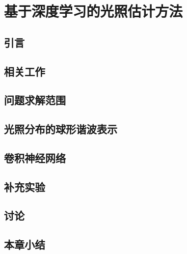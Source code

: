 \chapter{基于深度学习的光照估计方法}
\section{引言}
\section{相关工作}
\section{问题求解范围}
\section{光照分布的球形谐波表示}
\section{卷积神经网络}
\section{补充实验}
\section{讨论}
\section{本章小结}
